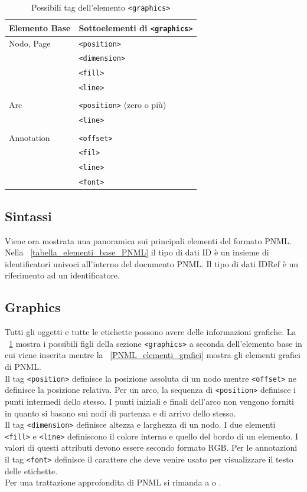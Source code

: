 \documentclass[italian,12pt]{book}
\begin{document}
\begin{table}
  \begin{tabular}{|l|l|}
    \hline
    Elemento Base         & Sottoelementi di {\tt<graphics>} \\
    \hline
    Nodo, Page            & {\tt<position>} \\
    & {\tt<dimension>} \\
    & {\tt<fill>} \\
    & {\tt<line>} \\
    & \\
    Arc                   & {\tt<position>} (zero o più) \\
    & {\tt<line>} \\
    & \\
    Annotation            & {\tt<offset>} \\
    & {\tt<fil>} \\
    & {\tt<line>} \\
    & {\tt<font>} \\
    \hline
  \end{tabular}
  \caption{Possibili tag dell'elemento {\tt<graphics>}\label{tabella_graphics}}
\end{table}

\subsection{Sintassi}
Viene ora mostrata una panoramica sui principali elementi del formato PNML.
Nella \tablename~\ref{tabella_elementi_base_PNML} il tipo di dati ID è un insieme
di identificatori univoci all'interno del documento PNML. Il tipo di dati IDRef
è un riferimento ad un identificatore.

\subsection{Graphics}
Tutti gli oggetti e tutte le etichette possono avere delle informazioni grafiche.
La \tablename~\ref{tabella_graphics} mostra i possibili figli della
sezione  {\tt<graphics>} a seconda dell'elemento base in cui viene inserita mentre la \tablename~\ref{PNML_elementi_grafici} mostra gli elementi grafici di PNML.\\
Il tag {\tt<position>}  definisce la posizione assoluta di un nodo mentre {\tt<offset>} 
ne definisce la posizione relativa. Per un arco, la sequenza di {\tt<position>} 
definisce i punti intermedi dello stesso. I punti iniziali e finali dell'arco non vengono forniti
in quanto si basano sui nodi di partenza e di arrivo dello stesso.\\
Il tag {\tt<dimension>}  definisce altezza e larghezza di un nodo. I due elementi 
{\tt<fill>}  e {\tt<line>}  definiscono il colore interno e quello del bordo 
di un elemento. I valori di questi attributi devono essere secondo formato RGB.
Per le annotazioni il tag {\tt<font>} definisce il carattere 
che deve venire usato per visualizzare il testo delle etichette.\\
Per una trattazione approfondita di PNML si rimanda a
\cite{WEB-KINDLER} o \cite{KINDLER}.
\end{document}
